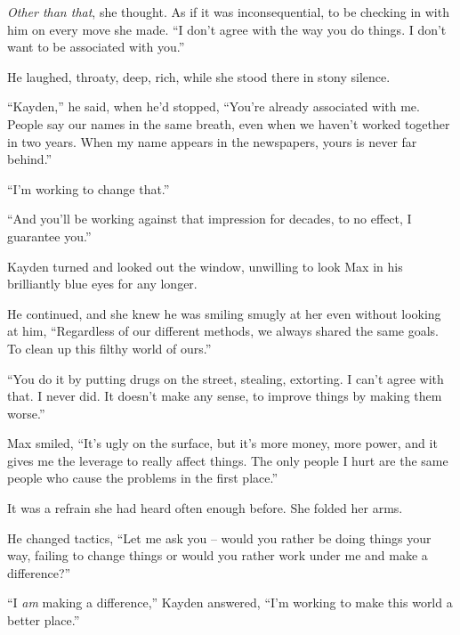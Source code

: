 \emph{Other than that}, she thought.  As if it was inconsequential, to be checking in with him on every move she made.  ``I don't agree with the way you do things.  I don't want to be associated with you.''



He laughed, throaty, deep, rich, while she stood there in stony silence.



``Kayden,'' he said, when he'd stopped, ``You're already associated with me.  People say our names in the same breath, even when we haven't worked together in two years.  When my name appears in the newspapers, yours is never far behind.''



``I'm working to change that.''



``And you'll be working against that impression for decades, to no effect, I guarantee you.''



Kayden turned and looked out the window, unwilling to look Max in his brilliantly blue eyes for any longer.



He continued, and she knew he was smiling smugly at her even without looking at him, ``Regardless of our different methods, we always shared the same goals.  To clean up this filthy world of ours.''



``You do it by putting drugs on the street, stealing, extorting.  I can't agree with that.  I never did.  It doesn't make any sense, to improve things by making them worse.''



Max smiled, ``It's ugly on the surface, but it's more money, more power, and it gives me the leverage to really affect things.  The only people I hurt are the same people who cause the problems in the first place.''



It was a refrain she had heard often enough before.  She folded her arms.



He changed tactics, ``Let me ask you – would you rather be doing things your way, failing to change things or would you rather work under me and make a difference?''



``I \emph{am} making a difference,'' Kayden answered, ``I'm working to make this world a better place.''



